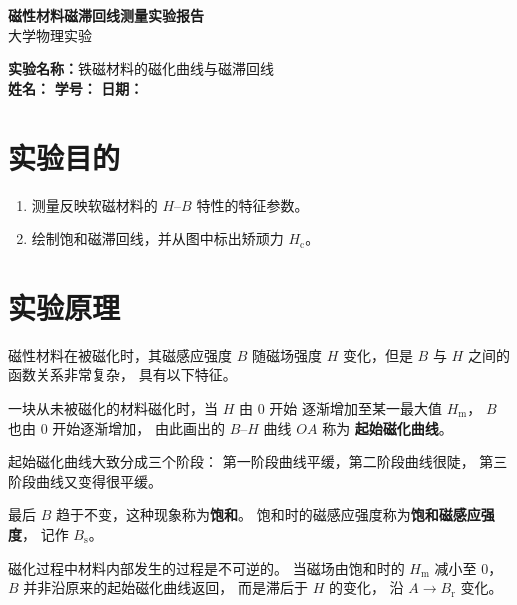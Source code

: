 \documentclass[UTF8,a4paper,12pt,fontset=none]{ctexart}
\begin{document}

\begin{center}
{\LARGE\bfseries 磁性材料磁滞回线测量实验报告}\\[0.6em]
{\large 大学物理实验}
\end{center}

\noindent
\textbf{实验名称：}铁磁材料的磁化曲线与磁滞回线\\
\textbf{姓名：}\underline{\hspace{4cm}}
\quad
\textbf{学号：}\underline{\hspace{4cm}}
\quad
\textbf{日期：}\underline{\hspace{2.8cm}}


\section{实验目的}

\begin{enumerate}
    \item 测量反映软磁材料的 $H$--$B$ 特性的特征参数。
    \item 绘制饱和磁滞回线，并从图中标出矫顽力
    $H_{\mathrm c}$。
\end{enumerate}


\section{实验原理}

磁性材料在被磁化时，其磁感应强度 $B$ 随磁场强度 $H$
变化，但是 $B$ 与 $H$ 之间的函数关系非常复杂，
具有以下特征。

一块从未被磁化的材料磁化时，当 $H$ 由 $0$ 开始
逐渐增加至某一最大值 $H_{\mathrm m}$，
$B$ 也由 $0$ 开始逐渐增加，
由此画出的 $B$--$H$ 曲线 $OA$ 称为
\textbf{起始磁化曲线}。

起始磁化曲线大致分成三个阶段：
第一阶段曲线平缓，第二阶段曲线很陡，
第三阶段曲线又变得很平缓。

最后 $B$ 趋于不变，这种现象称为\textbf{饱和}。
饱和时的磁感应强度称为\textbf{饱和磁感应强度}，
记作 $B_{\mathrm s}$。

磁化过程中材料内部发生的过程是不可逆的。
当磁场由饱和时的 $H_{\mathrm m}$ 减小至 $0$，
$B$ 并非沿原来的起始磁化曲线返回，
而是滞后于 $H$ 的变化，
沿 $A\to B_{\mathrm r}$ 变化。
\end{document}
